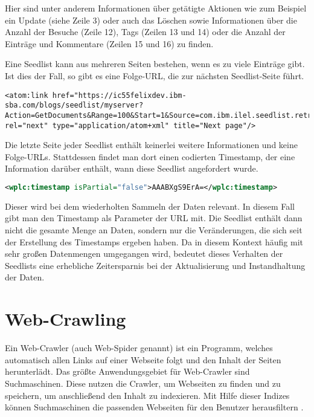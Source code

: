 Hier sind unter anderem Informationen über getätigte Aktionen wie zum Beispiel ein Update (siehe Zeile 3) oder auch das Löschen sowie Informationen über die Anzahl der Besuche (Zeile 12), Tags (Zeilen 13 und 14) oder die Anzahl der Einträge und Kommentare (Zeilen 15 und 16) zu finden.

Eine Seedlist kann aus mehreren Seiten bestehen, wenn es zu viele Einträge gibt. Ist dies der Fall, so gibt es eine Folge-URL, die zur nächsten Seedlist-Seite führt. \\
\begin{lstlisting}[title=Darstellung der Folge-URL in der Seedlist]
<atom:link href="https://ic55felixdev.ibm-sba.com/blogs/seedlist/myserver?Action=GetDocuments&Range=100&Start=1&Source=com.ibm.ilel.seedlist.retriever.connections.blogs.BlogsRetrieverFactory&Format=atom&Locale=en_US&State=MTsxNDk3ODcyMDE0Mjg5OzA7MTUwMzMxODA1MzU1Mjt0cnVlOzA7MA%3D%3D" rel="next" type="application/atom+xml" title="Next page"/>
\end{lstlisting}

Die letzte Seite jeder Seedlist enthält keinerlei weitere Informationen und keine Folge-URLs. Stattdessen findet man dort einen codierten Timestamp, der eine Information darüber enthält, wann diese Seedlist angefordert wurde. \\

\noindent
\begin{minipage}{\linewidth}
\begin{lstlisting}[title=Beispiel eines Timestamps: AAABXgS9ErA, language=XML]
<wplc:timestamp isPartial="false">AAABXgS9ErA=</wplc:timestamp>
\end{lstlisting}
\end{minipage}

Dieser wird bei dem wiederholten Sammeln der Daten relevant. In diesem Fall gibt man den Timestamp als Parameter der URL mit. Die Seedlist enthält dann nicht die gesamte Menge an Daten, sondern nur die Veränderungen, die sich seit der Erstellung des Timestamps ergeben haben. Da in diesem Kontext häufig mit sehr großen Datenmengen umgegangen wird, bedeutet dieses Verhalten der Seedlists eine erhebliche Zeitersparnis bei der Aktualisierung und Instandhaltung der Daten.


\newpage

\section{Web-Crawling}
Ein Web-Crawler (auch Web-Spider genannt) ist ein Programm, welches automatisch allen Links auf einer Webseite folgt und den Inhalt der Seiten herunterlädt. Das größte Anwendungsgebiet für Web-Crawler sind Suchmaschinen. Diese nutzen die Crawler, um Webseiten zu finden und zu speichern, um anschließend den Inhalt zu indexieren. Mit Hilfe dieser Indizes können Suchmaschinen die passenden Webseiten für den Benutzer herausfiltern \cite{crawl}.

